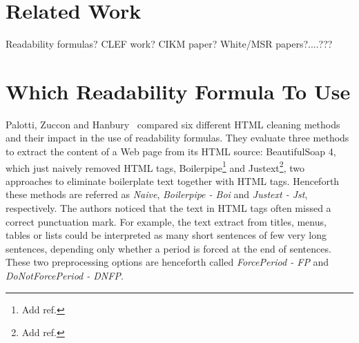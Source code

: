 

\section{Related Work}
\label{sec:related}
Readability formulas? CLEF work? CIKM paper? White/MSR papers?....???

\section{Which Readability Formula To Use}
\label{sec:which_readability}


Palotti, Zuccon and Hanbury~\cite{palotti15} compared six different HTML cleaning methods and their impact in the use of readability formulas.
They evaluate three methods to extract the content of a Web page from its HTML source: BeautifulSoap 4, which just naively removed HTML tags, Boilerpipe\footnote{Add ref.} and Justext\footnote{Add ref.}, two approaches to eliminate boilerplate text together with HTML tags. Henceforth these methods are referred as \textit{Naive}, \textit{Boilerpipe - Boi} and \textit{Justext - Jst}, respectively.
The authors noticed that the text in HTML tags often missed a correct punctuation mark. For example, the text extract from titles, menus, tables or lists could be interpreted as many short sentences of few very long sentences, depending only whether a period is forced at the end of sentences. These two preprocessing options are henceforth called \textit{ForcePeriod - FP} and \textit{DoNotForcePeriod - DNFP}.

